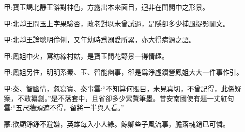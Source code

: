

\begin{parag}
    \begin{note}甲:寶玉謁北靜王辭對神色，方露出本來面目，迥非在閨閣中之形景。\end{note}
\end{parag}


\begin{parag}
    \begin{note}甲:北靜王問玉上字果驗否，政老對以未曾試過，是隱卻多少捕風捉影閒文。\end{note}
\end{parag}


\begin{parag}
    \begin{note}甲:北靜王論聰明伶俐，又年幼時爲溺愛所累，亦大得病源之語。\end{note}
\end{parag}


\begin{parag}
    \begin{note}甲:鳳姐中火，寫紡線村姑，是寶玉閒花野景一得情趣。\end{note}
\end{parag}


\begin{parag}
    \begin{note}甲:鳳姐另住，明明系秦、玉、智能幽事，卻是爲淨虛鑽營鳳姐大大一件事作引。\end{note}
\end{parag}


\begin{parag}
    \begin{note}甲:秦、智幽情，忽寫寶、秦事雲:“不知算何賬目，未見真切，不曾記得，此係疑案，不敢纂創。”是不落套中，且省卻多少累贅筆墨。昔安南國使有題一丈紅句雲:“五尺牆頭遮不得，留將一半與人看。”\end{note}
\end{parag}


\begin{parag}
    \begin{note}蒙:欲顯錚錚不避嫌，英雄每入小人緣。鯨卿些子風流事，膽落魂銷已可憐。\end{note}
\end{parag}


